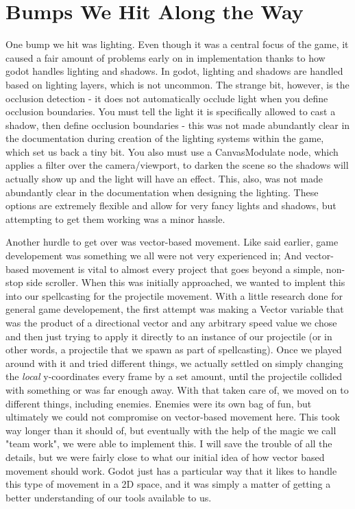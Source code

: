 \documentclass{sigchi}
\begin{document}
\section{Bumps We Hit Along the Way}
One bump we hit was lighting.  Even though it was a central focus of the game, it caused a fair amount of problems early on in implementation thanks to how godot handles lighting and shadows.  
In godot, lighting and shadows are handled based on lighting layers, which is not uncommon.  The strange bit, however, is the occlusion detection - it does not automatically occlude light 
when you define occlusion boundaries.
You must tell the light it is specifically allowed to cast a shadow, then define occlusion boundaries - this was not made abundantly clear in the 
documentation during creation of the lighting systems within the game, which set us back a tiny bit.  You also must use a CanvasModulate node, which applies a filter over the camera/viewport, 
to darken the scene so the shadows will actually show up and the light will have an effect.  This, also, was not made abundantly clear in the documentation when designing the lighting.  
These options are extremely flexible and allow for very fancy lights and shadows, but attempting to get them working was a minor hassle.

Another hurdle to get over was vector-based movement. Like said earlier, game developement was something we all were not very experienced in; And vector-based movement is vital to almost every
project that goes beyond a simple, non-stop side scroller. When this was initially approached, we wanted to implent this into our spellcasting for the projectile movement. With a little research
done for general game developement, the first attempt was making a Vector variable that was the product of a directional vector and any arbitrary speed value we chose and then just trying to apply
it directly to an instance of our projectile (or in other words, a projectile that we spawn as part of spellcasting). Once we played around with it and tried different things, we actually settled
on simply changing the \emph{local} y-coordinates every frame by a set amount, until the projectile collided with something or was far enough away. With that taken care of, we moved on to different
things, including enemies. Enemies were its own bag of fun, but ultimately we could not compromise on vector-based movement here. This took way longer than it should of, but eventually with the help
of the magic we call "team work", we were able to implement this. I will save the trouble of all the details, but we were fairly close to what our initial idea of how vector based movement should work.
Godot just has a particular way that it likes to handle this type of movement in a 2D space, and it was simply a matter of getting a better understanding of our tools available to us.
\end{document}
